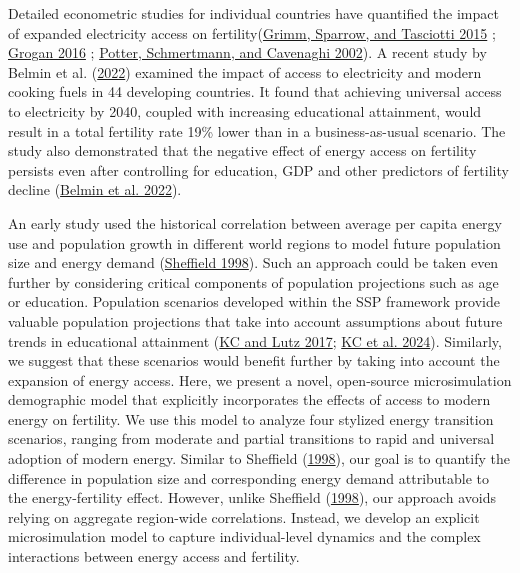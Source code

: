 \documentclass[
]{article}
\begin{document}
Detailed econometric studies for individual countries have quantified the impact of expanded electricity access on fertility(\protect\hyperlink{ref-grimm_does_2015}{Grimm, Sparrow, and Tasciotti 2015} ; \protect\hyperlink{ref-grogan_household_2016}{Grogan 2016} ; \protect\hyperlink{ref-potter_fertility_2002}{Potter, Schmertmann, and Cavenaghi 2002}). A recent study by Belmin et al. (\protect\hyperlink{ref-belmin_fertility_2022}{2022}) examined the impact of access to electricity and modern cooking fuels in 44 developing countries. It found that achieving universal access to electricity by 2040, coupled with increasing educational attainment, would result in a total fertility rate 19\% lower than in a business-as-usual scenario. The study also demonstrated that the negative effect of energy access on fertility persists even after controlling for education, GDP and other predictors of fertility decline (\protect\hyperlink{ref-belmin_fertility_2022}{Belmin et al. 2022}).

An early study used the historical correlation between average per capita energy use and population growth in different world regions to model future population size and energy demand (\protect\hyperlink{ref-sheffield_world_1998}{Sheffield 1998}). Such an approach could be taken even further by considering critical components of population projections such as age or education. Population scenarios developed within the SSP framework provide valuable population projections that take into account assumptions about future trends in educational attainment (\protect\hyperlink{ref-kc_human_2017}{KC and Lutz 2017}; \protect\hyperlink{ref-kc_updating_2024}{KC et al. 2024}). Similarly, we suggest that these scenarios would benefit further by taking into account the expansion of energy access. Here, we present a novel, open-source microsimulation demographic model that explicitly incorporates the effects of access to modern energy on fertility. We use this model to analyze four stylized energy transition scenarios, ranging from moderate and partial transitions to rapid and universal adoption of modern energy. Similar to Sheffield (\protect\hyperlink{ref-sheffield_world_1998}{1998}), our goal is to quantify the difference in population size and corresponding energy demand attributable to the energy-fertility effect. However, unlike Sheffield (\protect\hyperlink{ref-sheffield_world_1998}{1998}), our approach avoids relying on aggregate region-wide correlations. Instead, we develop an explicit microsimulation model to capture individual-level dynamics and the complex interactions between energy access and fertility.
\end{document}
